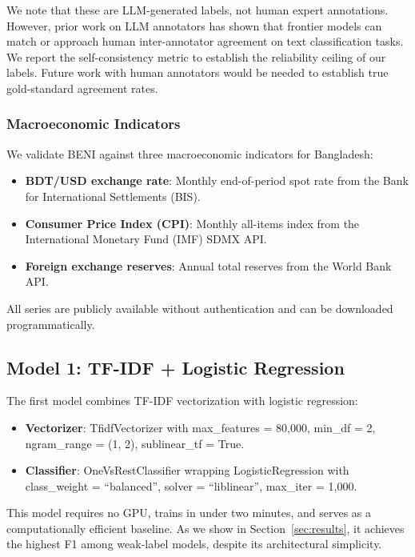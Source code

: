 We note that these are LLM-generated labels, not human expert annotations. However, prior work on LLM annotators \citep{gilardi2023chatgpt, hemmingsen2024llm} has shown that frontier models can match or approach human inter-annotator agreement on text classification tasks. We report the self-consistency metric to establish the reliability ceiling of our labels. Future work with human annotators would be needed to establish true gold-standard agreement rates.

\subsubsection{Macroeconomic Indicators}

We validate BENI against three macroeconomic indicators for Bangladesh:

\begin{itemize}
    \item \textbf{BDT/USD exchange rate}: Monthly end-of-period spot rate from the Bank for International Settlements (BIS).
    \item \textbf{Consumer Price Index (CPI)}: Monthly all-items index from the International Monetary Fund (IMF) SDMX API.
    \item \textbf{Foreign exchange reserves}: Annual total reserves from the World Bank API.
\end{itemize}

All series are publicly available without authentication and can be downloaded programmatically.

\subsection{Model 1: TF-IDF + Logistic Regression}

The first model combines TF-IDF vectorization with logistic regression:

\begin{itemize}
    \item \textbf{Vectorizer}: TfidfVectorizer with max\_features = 80,000, min\_df = 2, ngram\_range = (1, 2), sublinear\_tf = True.
    \item \textbf{Classifier}: OneVsRestClassifier wrapping LogisticRegression with class\_weight = ``balanced'', solver = ``liblinear'', max\_iter = 1,000.
\end{itemize}

This model requires no GPU, trains in under two minutes, and serves as a computationally efficient baseline. As we show in Section~\ref{sec:results}, it achieves the highest F1 among weak-label models, despite its architectural simplicity.

